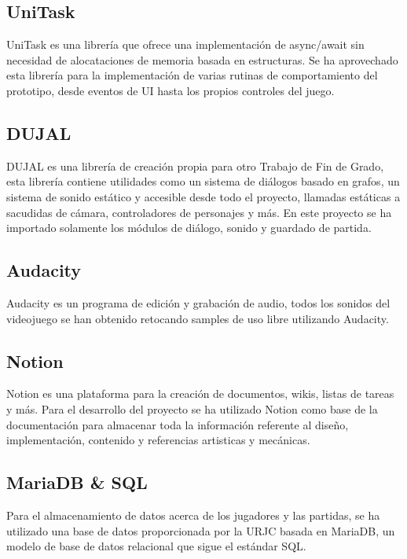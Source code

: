 \subsection{UniTask}

UniTask\cite{UniTask} es una librería que ofrece una implementación de async/await sin necesidad de alocataciones de memoria basada en estructuras. Se ha aprovechado esta librería para la implementación de varias rutinas de comportamiento del prototipo, desde eventos de UI hasta los propios controles del juego.

\subsection{DUJAL}

DUJAL\cite{DUJAL} es una librería de creación propia para otro Trabajo de Fin de Grado, esta librería contiene utilidades como un sistema de diálogos basado en grafos, un sistema de sonido estático y accesible desde todo el proyecto, llamadas estáticas a sacudidas de cámara, controladores de personajes y más. En este proyecto se ha importado solamente los módulos de diálogo, sonido y guardado de partida.

\subsection{Audacity}

Audacity\cite{Audacity} es un programa de edición y grabación de audio, todos los sonidos del videojuego se han obtenido retocando samples de uso libre utilizando Audacity.  

\subsection{Notion}

Notion\cite{notion} es una plataforma para la creación de documentos, wikis, listas de tareas y más. Para el desarrollo del proyecto se ha utilizado Notion como base de la documentación para almacenar toda la información referente al diseño, implementación, contenido y referencias artisticas y mecánicas.

\subsection{MariaDB \& SQL}

Para el almacenamiento de datos acerca de los jugadores y las partidas, se ha utilizado una base de datos proporcionada por la URJC basada en MariaDB\cite{mariadb}, un modelo de base de datos relacional que sigue el estándar SQL.

